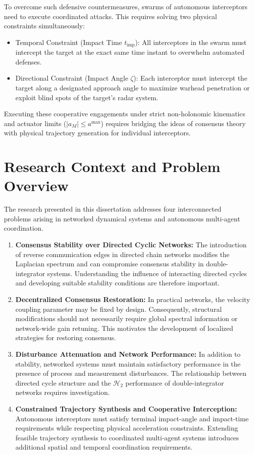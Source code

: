 To overcome such defensive countermeasures, swarms of autonomous interceptors need to execute coordinated attacks. This requires solving two physical constraints simultaneously:
\begin{itemize}
    \item Temporal Constraint (Impact Time $t_{\text{imp}}$): All interceptors in the swarm must intercept the target at the exact same time instant to overwhelm automated defenses.
    \item Directional Constraint (Impact Angle $\zeta$): Each interceptor must intercept the target along a designated approach angle to maximize warhead penetration or exploit blind spots of the target's radar system.
\end{itemize}
Executing these cooperative engagements under strict non-holonomic kinematics and actuator limits ($\vert{}a_M\vert{} \le a^{\text{max}}$) requires bridging the ideas of consensus theory with physical trajectory generation for individual interceptors.

\section{Research Context and Problem Overview}
The research presented in this dissertation addresses four interconnected problems arising in networked dynamical systems and autonomous multi-agent coordination.
\begin{enumerate}
    \item \textbf{Consensus Stability over Directed Cyclic Networks:} The introduction of reverse communication edges in directed
    chain networks modifies the Laplacian spectrum and can compromise consensus stability in double-integrator systems.
    Understanding the influence of interacting directed cycles and developing suitable stability conditions are therefore
    important.
    \item \textbf{Decentralized Consensus Restoration:} In practical networks, the velocity coupling parameter may be fixed by design. Consequently, structural modifications should not necessarily require global spectral information or network-wide gain retuning. This motivates the development
    of localized strategies for restoring consensus.
    \item \textbf{Disturbance Attenuation and Network Performance:} In addition to stability, networked systems must maintain
    satisfactory performance in the presence of process and measurement disturbances. The relationship between directed cycle structure and the $\mathcal{H}_2$ performance of double-integrator networks requires investigation.
    \item \textbf{Constrained Trajectory Synthesis and Cooperative Interception:} Autonomous interceptors must satisfy terminal impact-angle and impact-time requirements while respecting physical acceleration constraints. Extending feasible trajectory synthesis to coordinated multi-agent systems introduces additional spatial and temporal coordination requirements.
\end{enumerate}
